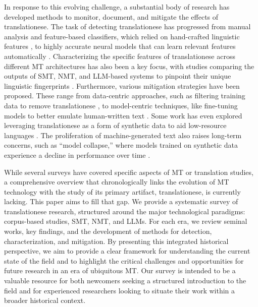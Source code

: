 In response to this evolving challenge, a substantial body of research has developed methods to monitor, document, and mitigate the effects of translationese. The task of detecting translationese has progressed from manual analysis and feature-based classifiers, which relied on hand-crafted linguistic features \cite{baroni2006new,volansky2015features}, to highly accurate neural models that can learn relevant features automatically \cite{pylypenko2021comparing,amponsah2022explaining}. Characterizing the specific features of translationese across different MT architectures has also been a key focus, with studies comparing the outputs of SMT, NMT, and LLM-based systems to pinpoint their unique linguistic fingerprints \cite{riley2020translationese,zhou2024comparison}. Furthermore, various mitigation strategies have been proposed. These range from data-centric approaches, such as filtering training data to remove translationese \cite{lembersky2013improving}, to model-centric techniques, like fine-tuning models to better emulate human-written text \cite{jourdan2025translationese}. Some work has even explored leveraging translationese as a form of synthetic data to aid low-resource languages \cite{dabre2024pretraining}. The proliferation of machine-generated text also raises long-term concerns, such as ``model collapse,'' where models trained on synthetic data experience a decline in performance over time \cite{shumailov2024ai}.

While several surveys have covered specific aspects of MT or translation studies, a comprehensive overview that chronologically links the evolution of MT technology with the study of its primary artifact, translationese, is currently lacking. This paper aims to fill that gap. We provide a systematic survey of translationese research, structured around the major technological paradigms: corpus-based studies, SMT, NMT, and LLMs. For each era, we review seminal works, key findings, and the development of methods for detection, characterization, and mitigation. By presenting this integrated historical perspective, we aim to provide a clear framework for understanding the current state of the field and to highlight the critical challenges and opportunities for future research in an era of ubiquitous MT. Our survey is intended to be a valuable resource for both newcomers seeking a structured introduction to the field and for experienced researchers looking to situate their work within a broader historical context.
